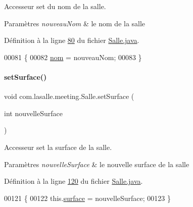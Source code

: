 Accesseur set du nom de la salle. 


\begin{DoxyParams}{Paramètres}
{\em nouveau\+Nom} & le nom de la salle \\
\hline
\end{DoxyParams}


Définition à la ligne \hyperlink{_salle_8java_source_l00080}{80} du fichier \hyperlink{_salle_8java_source}{Salle.\+java}.


\begin{DoxyCode}
00081     \{
00082         \hyperlink{classcom_1_1lasalle_1_1meeting_1_1_salle_a3641e82a9fa78c5dc8bd9a5b92bae482}{nom} = nouveauNom;
00083     \}
\end{DoxyCode}
\mbox{\label{classcom_1_1lasalle_1_1meeting_1_1_salle_ac95af260fcfd0ad267de052cdc0dbeae}} 
\paragraph{\texorpdfstring{set\+Surface()}{setSurface()}}
{\footnotesize\ttfamily void com.\+lasalle.\+meeting.\+Salle.\+set\+Surface (\begin{DoxyParamCaption}\item[{int}]{nouvelle\+Surface }\end{DoxyParamCaption})}



Accesseur set la surface de la salle. 


\begin{DoxyParams}{Paramètres}
{\em nouvelle\+Surface} & le nouvelle surface de la salle \\
\hline
\end{DoxyParams}


Définition à la ligne \hyperlink{_salle_8java_source_l00120}{120} du fichier \hyperlink{_salle_8java_source}{Salle.\+java}.


\begin{DoxyCode}
00121     \{
00122         this.\hyperlink{classcom_1_1lasalle_1_1meeting_1_1_salle_a1b761514679fa5f98e71809fea448384}{surface} = nouvelleSurface;
00123     \}
\end{DoxyCode}
\mbox{\label{classcom_1_1lasalle_1_1meeting_1_1_salle_ae618bd9da7fd68e4789b3d87a4aa90b3}} 

